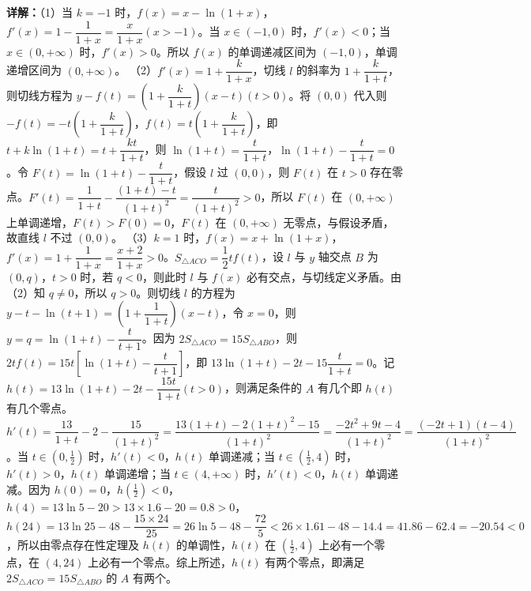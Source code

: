 \begin{question}[points=15]
\begin{solution}
\textbf{详解：}（1）当 $k=-1$ 时，$f(x)=x-\ln(1+x)$，$f'(x)=1-\dfrac{1}{1+x}=\dfrac{x}{1+x}(x>-1)$。当 $x\in(-1,0)$ 时，$f'(x)<0$；当 $x\in(0,+\infty)$ 时，$f'(x)>0$。所以 $f(x)$ 的单调递减区间为 $(-1,0)$，单调递增区间为 $(0,+\infty)$。
（2）$f'(x)=1+\dfrac{k}{1+x}$，切线 $l$ 的斜率为 $1+\dfrac{k}{1+t}$，则切线方程为 $y-f(t)=\left(1+\dfrac{k}{1+t}\right)(x-t)(t>0)$。将 $(0,0)$ 代入则 $-f(t)=-t\left(1+\dfrac{k}{1+t}\right)$，$f(t)=t\left(1+\dfrac{k}{1+t}\right)$，即 $t+k\ln(1+t)=t+\dfrac{kt}{1+t}$，则 $\ln(1+t)=\dfrac{t}{1+t}$，$\ln(1+t)-\dfrac{t}{1+t}=0$。令 $F(t)=\ln(1+t)-\dfrac{t}{1+t}$，假设 $l$ 过 $(0,0)$，则 $F(t)$ 在 $t>0$ 存在零点。$F'(t)=\dfrac{1}{1+t}-\dfrac{(1+t)-t}{(1+t)^2}=\dfrac{t}{(1+t)^2}>0$，所以 $F(t)$ 在 $(0,+\infty)$ 上单调递增，$F(t)>F(0)=0$，$F(t)$ 在 $(0,+\infty)$ 无零点，与假设矛盾，故直线 $l$ 不过 $(0,0)$。
（3）$k=1$ 时，$f(x)=x+\ln(1+x)$，$f'(x)=1+\dfrac{1}{1+x}=\dfrac{x+2}{1+x}>0$。$S_{\triangle ACO}=\dfrac{1}{2}tf(t)$，设 $l$ 与 $y$ 轴交点 $B$ 为 $(0,q)$，$t>0$ 时，若 $q<0$，则此时 $l$ 与 $f(x)$ 必有交点，与切线定义矛盾。由（2）知 $q\neq0$，所以 $q>0$。则切线 $l$ 的方程为 $y-t-\ln(t+1)=\left(1+\dfrac{1}{1+t}\right)(x-t)$，令 $x=0$，则 $y=q=\ln(1+t)-\dfrac{t}{t+1}$。因为 $2S_{\triangle ACO}=15S_{\triangle ABO}$，则 $2tf(t)=15t\left[\ln(1+t)-\dfrac{t}{t+1}\right]$，即 $13\ln(1+t)-2t-15\dfrac{t}{1+t}=0$。记 $h(t)=13\ln(1+t)-2t-\dfrac{15t}{1+t}(t>0)$，则满足条件的 $A$ 有几个即 $h(t)$ 有几个零点。$h'(t)=\dfrac{13}{1+t}-2-\dfrac{15}{(1+t)^2}=\dfrac{13(1+t)-2(1+t)^2-15}{(1+t)^2}=\dfrac{-2t^2+9t-4}{(1+t)^2}=\dfrac{(-2t+1)(t-4)}{(1+t)^2}$。当 $t\in(0,\frac{1}{2})$ 时，$h'(t)<0$，$h(t)$ 单调递减；当 $t\in(\frac{1}{2},4)$ 时，$h'(t)>0$，$h(t)$ 单调递增；当 $t\in(4,+\infty)$ 时，$h'(t)<0$，$h(t)$ 单调递减。因为 $h(0)=0$，$h(\frac{1}{2})<0$，$h(4)=13\ln5-20>13\times1.6-20=0.8>0$，$h(24)=13\ln25-48-\dfrac{15\times24}{25}=26\ln5-48-\dfrac{72}{5}<26\times1.61-48-14.4=41.86-62.4=-20.54<0$，所以由零点存在性定理及 $h(t)$ 的单调性，$h(t)$ 在 $(\frac{1}{2},4)$ 上必有一个零点，在 $(4,24)$ 上必有一个零点。综上所述，$h(t)$ 有两个零点，即满足 $2S_{\triangle ACO}=15S_{\triangle ABO}$ 的 $A$ 有两个。
\end{solution}
\end{question}

